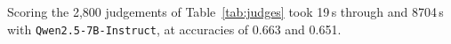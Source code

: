 Scoring the 2{,}800 judgements of Table~\ref{tab:judges} took 19\,s through \jev{} and 8704\,s with \texttt{Qwen2.5-7B-Instruct}, at accuracies of 0.663 and 0.651.
